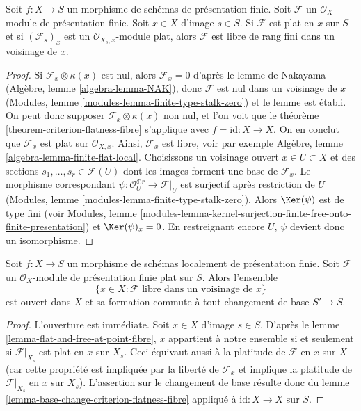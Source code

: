 \begin{lemma}
\label{lemma-flat-and-free-at-point-fibre}
Soit $f : X \to S$ un morphisme de schémas de présentation finie.
Soit $\mathcal{F}$ un $\mathcal{O}_X$-module de présentation finie.
Soit $x \in X$ d'image $s \in S$.
Si $\mathcal{F}$ est plat en $x$ sur $S$ et si $(\mathcal{F}_s)_x$ est un
$\mathcal{O}_{X_s, x}$-module plat, alors $\mathcal{F}$
est libre de rang fini dans un voisinage de $x$.
\end{lemma}

\begin{proof}
Si $\mathcal{F}_x \otimes \kappa(x)$ est nul, alors $\mathcal{F}_x = 0$
d'après le lemme de Nakayama (Algèbre, lemme \ref{algebra-lemma-NAK}), donc
$\mathcal{F}$ est nul dans un voisinage de $x$
(Modules, lemme \ref{modules-lemma-finite-type-stalk-zero})
et le lemme est établi. On peut donc supposer $\mathcal{F}_x \otimes \kappa(x)$
non nul, et l'on voit que le
théorème \ref{theorem-criterion-flatness-fibre}
s'applique avec $f = \text{id} : X \to X$. On en conclut que $\mathcal{F}_x$
est plat sur $\mathcal{O}_{X, x}$. Ainsi, $\mathcal{F}_x$ est libre, voir
par exemple Algèbre, lemme \ref{algebra-lemma-finite-flat-local}.
Choisissons un voisinage ouvert $x \in U \subset X$ et des sections
$s_1, \ldots, s_r \in \mathcal{F}(U)$ dont les images forment une base de
$\mathcal{F}_x$. Le morphisme correspondant
$\psi : \mathcal{O}_U^{\oplus r} \to \mathcal{F}|_U$ est surjectif après
restriction de $U$ (Modules, lemme \ref{modules-lemma-finite-type-stalk-zero}).
Alors $\Ker(\psi)$ est de type fini (voir Modules, lemme
\ref{modules-lemma-kernel-surjection-finite-free-onto-finite-presentation})
et $\Ker(\psi)_x = 0$. En restreignant encore $U$,
$\psi$ devient donc un isomorphisme.
\end{proof}

\begin{lemma}
\label{lemma-finite-free-open}
Soit $f : X \to S$ un morphisme de schémas
localement de présentation finie.
Soit $\mathcal{F}$ un $\mathcal{O}_X$-module de présentation finie
plat sur $S$. Alors l'ensemble
$$
\{x \in X : \mathcal{F}\text{ libre dans un voisinage de }x\}
$$
est ouvert dans $X$ et sa formation commute à tout changement de base
$S' \to S$.
\end{lemma}

\begin{proof}
L'ouverture est immédiate. Soit $x \in X$ d'image $s \in S$.
D'après le lemme \ref{lemma-flat-and-free-at-point-fibre},
$x$ appartient à notre ensemble si et seulement si
$\mathcal{F}|_{X_s}$ est plat en $x$ sur $X_s$.
Ceci équivaut aussi à la platitude de $\mathcal{F}$
en $x$ sur $X$ (car cette propriété est
impliquée par la liberté de $\mathcal{F}_x$ et implique
la platitude de $\mathcal{F}|_{X_s}$ en $x$ sur $X_s$).
L'assertion sur le changement de base résulte donc du
lemme \ref{lemma-base-change-criterion-flatness-fibre}
appliqué à $\text{id} : X \to X$ sur $S$.
\end{proof}
